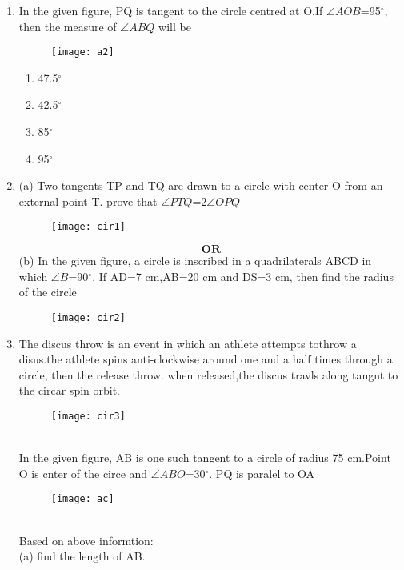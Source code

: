 \documentclass{article}
\begin{document}
\begin{enumerate}
\item In the given figure, PQ is tangent to the circle centred at O.If $\angle{AOB}$=95$^\circ$, then the measure of $\angle{ABQ}$ will be
	\begin{figure}[h]
		\centering
	\texttt{[image: a2]}
\end{figure}
		\begin{multicols}{2}
			\begin{enumerate}
		\item 47.5$^\circ$
		\item 42.5$^\circ$
		\item 85$^\circ$
		\item 95$^\circ$
			\end{enumerate}
		\end{multicols}
	\item (a) Two tangents TP and TQ are drawn to a circle with center O from an external point T. prove that $\angle{PTQ}$=2$\angle{OPQ}$
		\begin{figure}[h]
			\centering
			\texttt{[image: cir1]}
		\end{figure}
		$$\textbf{OR}$$
		(b) In the given figure, a circle is inscribed in a quadrilaterals ABCD in which $\angle{B}$=90$^\circ$. If AD=7 cm,AB=20 cm and DS=3 cm, then find the radius of the circle
		\begin{figure}[h]
			\centering
			\texttt{[image: cir2]}
		\end{figure}
	\item The discus throw is an event in which an athlete attempts tothrow a disus.the athlete spins anti-clockwise around one and a half times through a circle, then the release throw. when released,the discus travls along tangnt to the circar spin orbit.
		\begin{figure}[h]
			\centering
			\texttt{[image: cir3]}
		\end{figure}\\
		In the given figure, AB is one such tangent to a circle of radius 75 cm.Point O is cnter of the circe and $\angle{ABO}$=30$^\circ$. PQ is paralel to OA
		\begin{figure}[h]
			\centering
			\texttt{[image: ac]}
		\end{figure}\\
		Based on above informtion:\\
		(a) find the length of AB.\\

\end{enumerate}
\end{document}
